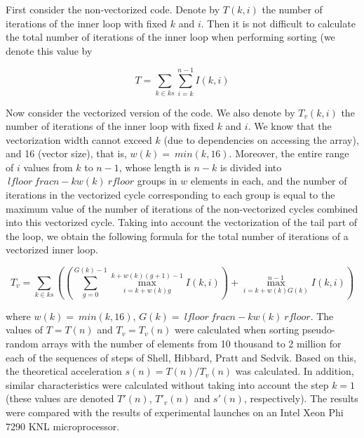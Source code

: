 \documentclass[
11pt,%
tightenlines,%
twoside,%
onecolumn,%
nofloats,%
nobibnotes,%
nofootinbib,%
superscriptaddress,%
noshowpacs,%
centertags]%
{revtex4}
\begin{document}
First consider the non-vectorized code. Denote by $ T (k, i) $ the number of iterations of the inner loop with fixed $ k $ and $ i $. Then it is not difficult to calculate the total number of iterations of the inner loop when performing sorting (we denote this value by 

\begin{equation}
T = \sum_{k \in ks}{\sum_{i = k}^{n - 1}{I(k, i)}}
\end{equation}

Now consider the vectorized version of the code. We also denote by $ T_v (k, i) $ the number of iterations of the inner loop with fixed $ k $ and $ i $. We know that the vectorization width cannot exceed $ k $ (due to dependencies on accessing the array), and 16 (vector size), that is, $ w (k) = \ min (k, 16) $. Moreover, the entire range of $ i $ values ​​from $ k $ to $ n - 1 $, whose length is $ n - k $ is divided into $ \ lfloor \ frac {n - k} {w (k)} \ rfloor $ groups in $ w $ elements in each, and the number of iterations in the vectorized cycle corresponding to each group is equal to the maximum value of the number of iterations of the non-vectorized cycles combined into this vectorized cycle. Taking into account the vectorization of the tail part of the loop, we obtain the following formula for the total number of iterations of a vectorized inner loop.

\begin{equation}
T_v = \sum_{k \in ks}
{
\left(
\left(
\sum_{g = 0}^{G(k) - 1}{\max_{i = k + w(k)g}^{k + w(k)(g + 1) - 1}{I(k, i)}}
\right)
+ \max_{i = k + w(k)G(k)}^{n - 1}{I(k, i)}
\right)
}
\end{equation}

where $ w (k) = \ min (k, 16) $, $ G (k) = \ lfloor \ frac {n - k} {w (k)} \ rfloor $. The values ​​of $ T = T (n) $ and $ T_v = T_v (n) $ were calculated when sorting pseudo-random arrays with the number of elements from 10 thousand to 2 million for each of the sequences of steps of Shell, Hibbard, Pratt and Sedvik. Based on this, the theoretical acceleration $ s (n) = T (n) / T_v (n) $ was calculated. In addition, similar characteristics were calculated without taking into account the step $ k = 1 $ (these values ​​are denoted $ T '(n) $, $ T'_v (n) $ and $ s' (n) $, respectively). The results were compared with the results of experimental launches on an Intel Xeon Phi 7290 KNL microprocessor.
\end{document}
